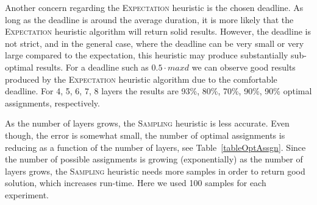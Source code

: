 \documentclass[letterpaper]{article} %
\newcommand{\commentout}[1]{}
\newcommand{\astar}{\textsc{A*}\xspace}
\newcommand{\sampling}{\textsc{Sampling}\xspace}
\newcommand{\expectation}{\textsc{Expectation}\xspace}
\begin{document}
Another concern regarding the \expectation heuristic is the chosen deadline. As long as the deadline is around the average duration, it is more likely that the \expectation heuristic algorithm will return solid results. However, the deadline is not strict, and in the general case, where the deadline can be very small or very large compared to the expectation, this heuristic may produce substantially sub-optimal results. For a deadline such as $0.5\cdot maxd$ we can observe good results produced by the \expectation heuristic algorithm due to the comfortable deadline. For 4, 5, 6, 7, 8 layers the results are 93\%, 80\%, 70\%, 90\%, 90\% optimal assignments, respectively.

\commentout{
\begin{figure}[h!]
	\scriptsize
	\begin{tikzpicture}
	\begin{axis}[
	scale=0.7,
	xlabel={\#Layers},
	ylabel near ticks,
	ylabel={\#Opt assignments},
	xmin=4, xmax=8,
	ymin=0, ymax=30,
	legend pos=outer north east,
	ymajorgrids=true,
	grid style=dashed,
	]

	\addplot[
	color=blue,
	mark=x,
	]
	coordinates {
		(4 , 30)
		(5 , 30)
		(6 , 30)
		(7 , 30)
		(8 , 30)

	};
	\addlegendentry{BF}

	\addplot[
	color=gray,
	mark=x,
	]
	coordinates {
		(4 , 30)
		(5 , 30)
		(6 , 30)
		(7 , 30)
		(8 , 30)

	};
	\addlegendentry{\astar}

	\addplot[
	color=green,
	mark=o,
	]
	coordinates {
		(4 , 30)
		(5 , 29)
		(6 , 25)
		(7 , 21)
        (8 , 22)
	};
	\addlegendentry{\sampling}


	\addplot[
	color=red,
	mark=square,
	]
	coordinates {
		(4 , 28)
		(5 , 24)
		(6 , 21)
		(7 , 27)
		(8 , 27)

	};
	\addlegendentry{\expectation}



	\end{axis}
	\end{tikzpicture}
	\caption{Number of optimal assignments comparison of all heuristic algorithms for deadline of size $0.5\cdot maxd$ and ``Structural" distribution}\label{05reg}
\end{figure}}

As the number of layers grows, the \sampling heuristic is less accurate. Even though, the error is somewhat small, the number of optimal assignments is reducing as a function of the number of layers, see Table~\ref{tableOptAssgn}. Since the number of possible assignments is growing (exponentially) as the number of layers grows, the \sampling heuristic needs more samples in order to return good solution, which increases run-time. Here we used 100 samples for each experiment.
\end{document}
